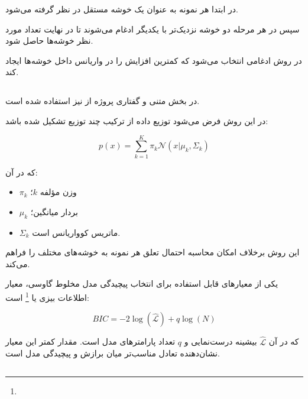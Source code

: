 در
ابتدا هر نمونه به عنوان یک خوشه مستقل در نظر گرفته می‌شود.

سپس در هر مرحله دو خوشه نزدیک‌تر با یکدیگر ادغام می‌شوند تا در نهایت تعداد مورد نظر خوشه‌ها حاصل شود.

در روش
ادغامی انتخاب می‌شود که کمترین افزایش را در واریانس داخل خوشه‌ها ایجاد کند.


\subsection{}

در بخش متنی و گفتاری پروژه از
نیز استفاده شده است.

در این روش فرض می‌شود توزیع داده از ترکیب چند توزیع
تشکیل شده باشد:

\begin{equation}
p(x)
=
\sum_{k=1}^{K}
\pi_k
\mathcal{N}
(x|\mu_k,\Sigma_k)
\end{equation}

که در آن:

\begin{itemize}
	\item $\pi_k$ وزن مؤلفه $k$؛
	\item $\mu_k$ بردار میانگین؛
	\item $\Sigma_k$ ماتریس کوواریانس است.
\end{itemize}

این روش برخلاف
امکان محاسبه احتمال تعلق هر نمونه به خوشه‌های مختلف را فراهم می‌کند.

یکی از معیارهای قابل استفاده برای انتخاب پیچیدگی مدل مخلوط گاوسی، معیار اطلاعات بیزی یا
\footnote{}
است:

\begin{equation}
BIC
=
-2\log(\hat{\mathcal{L}})
+
q\log(N)
\end{equation}

که در آن $\hat{\mathcal{L}}$ بیشینه درست‌نمایی و $q$ تعداد پارامترهای مدل است. مقدار کمتر این معیار نشان‌دهنده تعادل مناسب‌تر میان برازش و پیچیدگی مدل است.


\subsection{}

